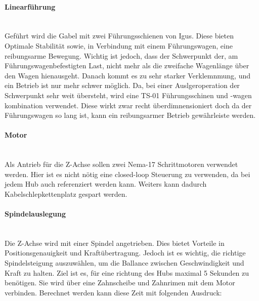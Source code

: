 \paragraph{Linearführung}\mbox{}\\
Geführt wird die Gabel mit zwei Führungsschienen von Igus. Diese bieten Optimale Stabilität sowie, in Verbindung mit einem Führungswagen, eine reibungsarme Bewegung. Wichtig ist jedoch, dass der Schwerpunkt der, am Führungswagenbefestigten Last, nicht mehr als die zweifache Wagenlänge über den Wagen hienausgeht. Danach kommt es zu sehr starker Verklemnmung, und ein Betrieb ist nur mehr schwer möglich. Da, bei einer Auslgeroperation der Schwerpunkt sehr weit übersteht, wird eine TS-01 Führungsschinen und -wagen kombination verwendet. Diese wirkt zwar recht überdimnensioniert doch da der Führungswagen so lang ist, kann ein reibungsarmer Betrieb gewährleiste werden. 

\paragraph{Motor}\mbox{}\\
Als Antrieb für die Z-Achse sollen zwei Nema-17 Schrittmotoren verwendet werden. Hier ist es nicht nötig eine closed-loop Steuerung zu verwenden, da bei jedem Hub auch referenziert werden kann. Weiters kann dadurch Kabelschlepkettenplatz gespart werden. 

\paragraph{Spindelauslegung}\mbox{}\\
Die Z-Achse wird mit einer Spindel angetrieben. Dies bietet Vorteile in Positionsgenauigkeit und Kraftübertragung. Jedoch ist es wichtig, die richtige Spindelsteigung auszuwählen, um die Ballance zwischen Geschwindigkeit und Kraft zu halten. Ziel ist es, für eine richtung des Hubs maximal 5 Sekunden zu benötigen. Sie wird über eine Zahnscheibe und Zahnrimen mit dem Motor verbinden.
Berechnet werden kann diese Zeit mit folgenden Ausdruck:

